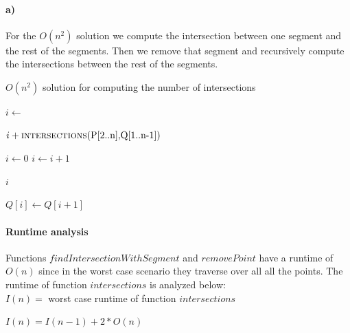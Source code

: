 \paragraph{a)} 
For the $O(n^2)$ solution we compute the intersection between one segment and the rest of the segments. Then we remove that segment and recursively compute the intersections between the rest of the segments.

\begin{algorithm}
	\caption{$O(n^2)$ solution for computing the number of intersections}
	\begin{algorithmic}
	  	\State $i \gets $  
		\State {} 
	
		\Return $i + \Call{intersections}{$P[2..n]$, $Q[1..n-1]$}$
	  \EndFunction
	
		\State $i \gets 0$
			\State $i \gets i + 1$
		\EndWhile
	
		\Return $i$
	  \EndFunction
	
			\State $Q[i] \gets Q[i + 1]$
		\EndFor
	  \EndFunction
	\end{algorithmic}
\end{algorithm}

\paragraph{Runtime analysis}
Functions $findIntersectionWithSegment$ and $removePoint$ have a runtime of $O(n)$ since in the worst case scenario they traverse over all all the points. The runtime of function $intersections$ is analyzed below: \\

$I(n) =$ worst case runtime of function $intersections$

$I(n) = I(n - 1) + 2 * O(n)$

